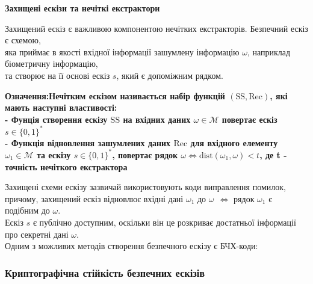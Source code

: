 \documentclass[11pt]{article}
\begin{document}
    \hypertarget{ux437ux430ux445ux438ux449ux435ux43dux456-ux435ux441ux43aux456ux437ux438-ux442ux430-ux43dux435ux447ux456ux442ux43aux456-ux435ux43aux441ux442ux440ux430ux43aux442ux43eux440ux438}{%
\textbf{Захищені ескізи та нечіткі
екстрактори}\label{ux437ux430ux445ux438ux449ux435ux43dux456-ux435ux441ux43aux456ux437ux438-ux442ux430-ux43dux435ux447ux456ux442ux43aux456-ux435ux43aux441ux442ux440ux430ux43aux442ux43eux440ux438}}

Захищений ескіз є важливою компонентою нечітких екстракторів. Безпечний
ескіз є схемою,\\
яка приймає в якості вхідної інформації зашумлену інформацію \(\omega\),
наприклад біометричну інформацію,\\
та створює на її основі ескіз \(s\), який є допоміжним рядком.

\bf{Означення:}\normalfont \space Нечітким ескізом називається набір функцій
\((\text{SS},\text{Rec})\), які мають наступні властивості: \\
- Фунція створення ескізу \(\text{SS}\) на вхідних даних
\(\omega \in \mathcal{M}\) повертає ескіз\\
\(s \in \{0,1\}^*\) \\
- Функція відновлення зашумлених даних
\(\text{Rec}\) для вхідного елементу \(\omega_1 \in \mathcal{M}\) та
ескізу \(s \in \{0,1\}^*\), повертає рядок
\(\omega \Longleftrightarrow \text{dist}(\omega_1,\omega)<t\), де t -
точність нечіткого екстрактора

Захищені схеми ескізу зазвичай використовують коди виправлення помилок,
причому, захищений ескіз відновлює 
вхідні дані \(\omega_1\) до \(\omega ~~ \Longleftrightarrow\) рядок
\(\omega_1\) є подібним до \(\omega\).\\
Ескіз \(s\) є публічно доступним, оскільки він це розкриває достатньої
інформації про секретні дані \(\omega\).\\
Одним з можливих методів створення безпечного ескізу є БЧХ-коди:
\vspace{30ex}
    \hypertarget{ux43aux440ux438ux43fux442ux43eux433ux440ux430ux444ux456ux447ux43dux430-ux441ux442ux456ux439ux43aux456ux441ux442ux44c-ux431ux435ux437ux43fux435ux447ux43dux438ux445-ux435ux441ux43aux456ux437ux456ux432}{%
\subsubsection{Криптографічна стійкість безпечних
ескізів}\label{ux43aux440ux438ux43fux442ux43eux433ux440ux430ux444ux456ux447ux43dux430-ux441ux442ux456ux439ux43aux456ux441ux442ux44c-ux431ux435ux437ux43fux435ux447ux43dux438ux445-ux435ux441ux43aux456ux437ux456ux432}}
\end{document}
